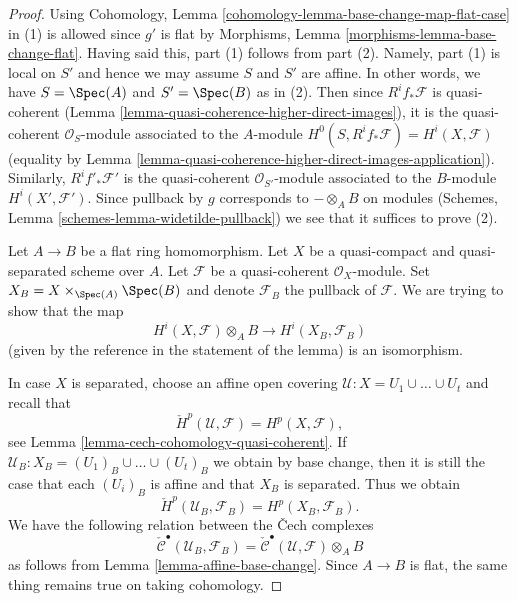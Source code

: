 \begin{proof}
Using Cohomology, Lemma \ref{cohomology-lemma-base-change-map-flat-case} in (1)
is allowed since $g'$ is flat by
Morphisms, Lemma \ref{morphisms-lemma-base-change-flat}.
Having said this, part (1) follows from part (2). Namely,
part (1) is local on $S'$ and hence we may assume $S$
and $S'$ are affine. In other words, we have $S = \Spec(A)$
and $S' = \Spec(B)$ as in (2).
Then since $R^if_*\mathcal{F}$ is quasi-coherent
(Lemma \ref{lemma-quasi-coherence-higher-direct-images}),
it is the quasi-coherent $\mathcal{O}_S$-module associated to the
$A$-module $H^0(S, R^if_*\mathcal{F}) = H^i(X, \mathcal{F})$
(equality by
Lemma \ref{lemma-quasi-coherence-higher-direct-images-application}).
Similarly, $R^if'_*\mathcal{F}'$ is the quasi-coherent
$\mathcal{O}_{S'}$-module associated to the $B$-module
$H^i(X', \mathcal{F}')$. Since pullback by $g$ corresponds
to $- \otimes_A B$ on modules
(Schemes, Lemma \ref{schemes-lemma-widetilde-pullback})
we see that it suffices to prove (2).

\medskip\noindent
Let $A \to B$ be a flat ring homomorphism.
Let $X$ be a quasi-compact and quasi-separated scheme over $A$.
Let $\mathcal{F}$ be a quasi-coherent $\mathcal{O}_X$-module.
Set $X_B = X \times_{\Spec(A)} \Spec(B)$ and denote
$\mathcal{F}_B$ the pullback of $\mathcal{F}$.
We are trying to show that the map
$$
H^i(X, \mathcal{F}) \otimes_A B \longrightarrow H^i(X_B, \mathcal{F}_B)
$$
(given by the reference in the statement of the lemma)
is an isomorphism.

\medskip\noindent
In case $X$ is separated, choose an affine open covering
$\mathcal{U} : X = U_1 \cup \ldots \cup U_t$ and recall that
$$
\check{H}^p(\mathcal{U}, \mathcal{F}) = H^p(X, \mathcal{F}),
$$
see
Lemma \ref{lemma-cech-cohomology-quasi-coherent}.
If $\mathcal{U}_B : X_B = (U_1)_B \cup \ldots \cup (U_t)_B$ we obtain
by base change, then it is still the case that each $(U_i)_B$ is affine
and that $X_B$ is separated. Thus we obtain
$$
\check{H}^p(\mathcal{U}_B, \mathcal{F}_B) = H^p(X_B, \mathcal{F}_B).
$$
We have the following relation between the {\v C}ech complexes
$$
\check{\mathcal{C}}^\bullet(\mathcal{U}_B, \mathcal{F}_B) =
\check{\mathcal{C}}^\bullet(\mathcal{U}, \mathcal{F}) \otimes_A B
$$
as follows from
Lemma \ref{lemma-affine-base-change}.
Since $A \to B$ is flat, the same thing remains true on taking cohomology.


\end{proof}
